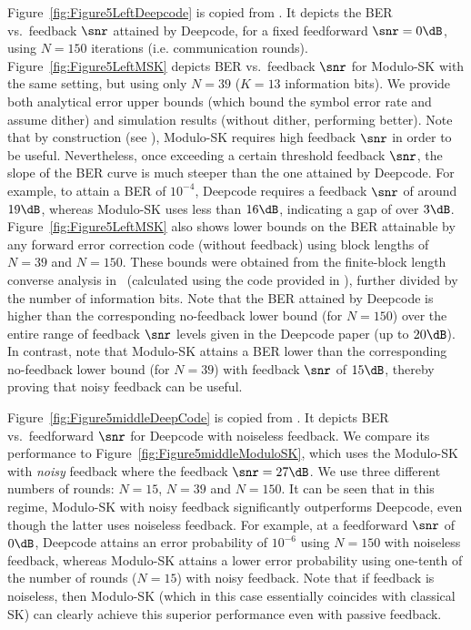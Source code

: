 Figure~\ref{fig:Figure5LeftDeepcode} is copied from \cite[Figure~5 (Left)]{kim2018deepcode}. It depicts the BER 
vs.~feedback $\snr$ attained by Deepcode, for a fixed feedforward $\snr=0\dB$, using $N=150$ iterations (i.e. communication rounds). Figure~\ref{fig:Figure5LeftMSK} depicts BER vs.~feedback $\snr$ for Modulo-SK with the same setting, but using only $N=39$ ($K=13$ information bits). We provide both analytical error upper bounds (which bound the symbol error rate and assume dither) and simulation results (without dither, performing better). Note that by construction (see \cite{ben2017interactive}), Modulo-SK requires high feedback $\snr$ in order to be useful. Nevertheless, once exceeding a certain threshold feedback $\snr$, the slope of the BER curve is much steeper than the one attained by Deepcode. For example, to attain a BER of $10^{-4}$, Deepcode requires a feedback $\snr$ of around $19\dB$, whereas Modulo-SK uses less than $16\dB$, indicating a gap of over $3\dB$. Figure~\ref{fig:Figure5LeftMSK} also shows lower bounds on the BER attainable by any forward error correction code (without feedback) using block lengths of $N=39$ and $N=150$. These bounds were obtained from the finite-block length converse analysis in~\cite{YuryFinite} (calculated using the code provided in \cite{spectre}), further divided by the number of information bits. Note that the BER attained by Deepcode is higher than the corresponding no-feedback lower bound (for $N=150$) over the entire range of feedback $\snr$ levels given in the Deepcode paper (up to $20\dB$). In contrast, note that Modulo-SK attains a BER lower than the corresponding no-feedback lower bound (for $N=39$) with feedback $\snr$ of $15\dB$, thereby proving that noisy feedback can be useful.

Figure~\ref{fig:Figure5middleDeepCode} is copied from \cite[Figure~5 (Middle)]{kim2018deepcode}. It depicts BER vs.~feedforward $\snr$ for Deepcode with noiseless feedback. We compare its performance to Figure~\ref{fig:Figure5middleModuloSK}, which uses the Modulo-SK with \textit{noisy} feedback where the feedback $\snr = 27\dB$. We use three different numbers of rounds: $N = 15$, $N = 39$ and $N = 150$. It can be seen that in this regime, Modulo-SK with noisy feedback significantly outperforms Deepcode, even though the latter uses noiseless feedback. 
For example, at a feedforward $\snr$ of $0\dB$, Deepcode attains an error probability of $10^{-6}$ using $N=150$ with noiseless feedback, whereas Modulo-SK attains a lower error probability using one-tenth of the number of rounds ($N=15$) with noisy feedback. Note that if feedback is noiseless, then Modulo-SK (which in this case essentially coincides with classical SK) can clearly achieve this superior performance even with passive feedback. 

